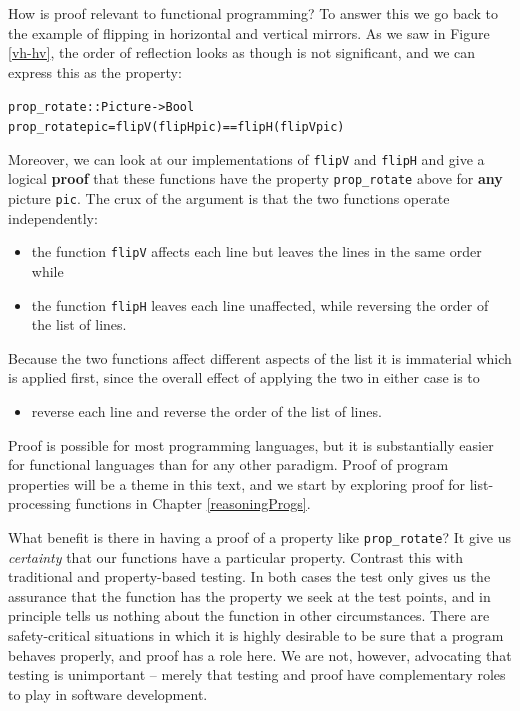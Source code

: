 How is proof relevant to functional programming? To answer this we go back to the example of flipping in horizontal and vertical mirrors. As we saw in Figure \ref{vh-hv}, the order of reflection looks as though is not significant, and we can express this as the property:
\begin{alltt}
prop_rotate :: Picture -> Bool
prop_rotate pic  =  flipV (flipH pic) == flipH (flipV pic)
\end{alltt} 
Moreover, we can look at our implementations of
\texttt{flipV} and \texttt{flipH} and give a logical
\textbf{proof} that these functions have the property
\texttt{prop\_rotate} above for \textbf{any} picture \texttt{pic}. The crux of the argument is that the two
functions operate independently:
\begin{itemize}
\item the function \texttt{flipV} affects each line but leaves the lines
in the same order while
\item the function \texttt{flipH} leaves each line unaffected, while
reversing the order of the list of lines.
\end{itemize}
Because the two functions affect different aspects of the list it is
immaterial which is applied first, since the overall effect of applying
the two in either case is to
\begin{itemize}
\item reverse each line and
reverse the order of the list of lines.
\end{itemize}
Proof is possible for most programming languages, but
it is substantially easier for functional languages than for any other
paradigm. Proof of program properties will be a theme in this text, and
we start by exploring proof for list-processing functions in Chapter
\ref{reasoningProgs}.

What benefit is there in having a proof of a property like \texttt{prop\_rotate}?
It give us {\em certainty\/} that our functions have a particular property. 
Contrast this with traditional and property-based testing. In both cases 
the test only gives us the assurance
that the function has the property we seek at the test points, and in principle tells us
nothing about the function in other circumstances. There are
safety-critical situations in which it is highly desirable to be sure
that a program behaves properly, and proof 
has a role here. We
are not, however, advocating that testing is unimportant -- merely that testing
and proof have complementary roles to play in software development. 
 

